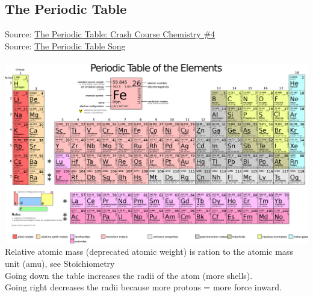 \subsection{The Periodic Table}
Source: \href{https://www.youtube.com/watch?v=0RRVV4Diomg&list=PL8dPuuaLjXtPHzzYuWy6fYEaX9mQQ8oGr&index=5}{The Periodic Table: Crash Course Chemistry \#4}\\
Source: \href{https://www.youtube.com/watch?v=rz4Dd1I_fX0}{The Periodic Table Song}
\\\\
\includegraphics[width=\textwidth]{./chemistry/imgs/ptoe.png}
\\
Relative atomic mass (deprecated atomic weight) is ration to the atomic mass unit (amu), see Stoichiometry\\
Going down the table increases the radii of the atom (more shells).\\
Going right decreases the radii because more protons = more force inward.

